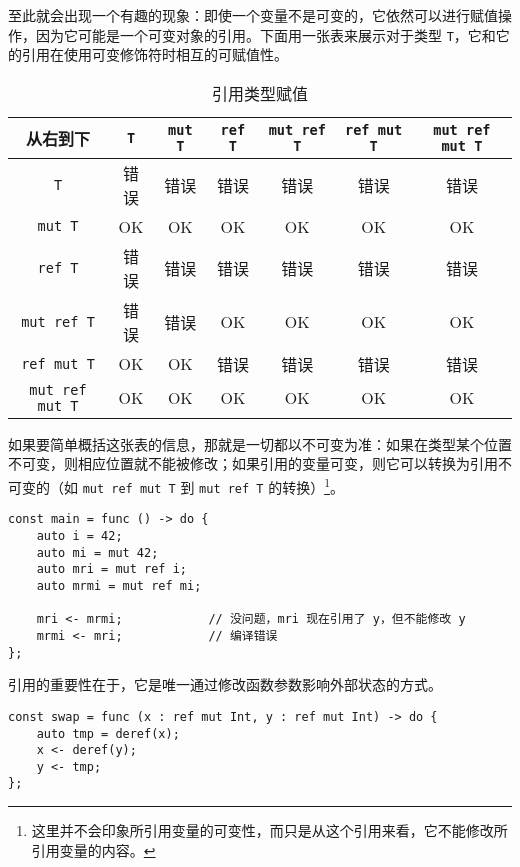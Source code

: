 至此就会出现一个有趣的现象：即使一个变量不是可变的，它依然可以进行赋值操作，因为它可能是一个可变对象的引用。下面用一张表来展示对于类型 \lstinline!T!，它和它的引用在使用可变修饰符时相互的可赋值性。

\begin{table}[h]
    \centering
    \begin{tabular}{|c|c|c|c|c|c|c|} \hline
        从右到下             & \lstinline!T! & \lstinline!mut T! & \lstinline!ref T! & \lstinline!mut ref T! & \lstinline!ref mut T!  & \lstinline!mut ref mut T!  \\\hline
        \lstinline!T!       & 错误 & 错误 & 错误 & 错误 & 错误 & 错误 \\\hline
        \lstinline!mut T!   & OK & OK & OK & OK & OK & OK \\\hline
        \lstinline!ref T!   & 错误 & 错误 & 错误 & 错误 & 错误 & 错误 \\\hline
        \lstinline!mut ref T!  & 错误 & 错误 & OK & OK & OK & OK \\\hline
        \lstinline!ref mut T!  & OK & OK & 错误 & 错误 & 错误 & 错误 \\\hline
        \lstinline!mut ref mut T! & OK & OK & OK & OK & OK & OK \\\hline
    \end{tabular}
    \caption{引用类型赋值}
    \label{tab:reference-constness}
\end{table}

如果要简单概括这张表的信息，那就是一切都以不可变为准：如果在类型某个位置不可变，则相应位置就不能被修改；如果引用的变量可变，则它可以转换为引用不可变的（如 \lstinline!mut ref mut T! 到 \lstinline!mut ref T! 的转换）\footnote{这里并不会印象所引用变量的可变性，而只是从这个引用来看，它不能修改所引用变量的内容。}。

\begin{lstlisting}
const main = func () -> do {
    auto i = 42;
    auto mi = mut 42;
    auto mri = mut ref i;
    auto mrmi = mut ref mi;

    mri <- mrmi;            // 没问题，mri 现在引用了 y，但不能修改 y
    mrmi <- mri;            // 编译错误
};
\end{lstlisting}

引用的重要性在于，它是唯一通过修改函数参数影响外部状态的方式。

\begin{lstlisting}
const swap = func (x : ref mut Int, y : ref mut Int) -> do {
    auto tmp = deref(x);
    x <- deref(y);
    y <- tmp;
};
\end{lstlisting}

